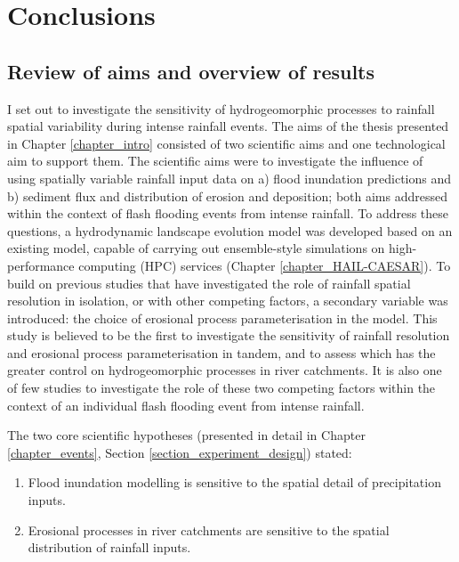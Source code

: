 \chapter{Conclusions}
\label{chapter_conclusion}

\section{Review of aims and overview of results}

I set out to investigate the sensitivity of hydrogeomorphic processes to rainfall spatial variability during intense rainfall events. The aims of the thesis presented in Chapter \ref{chapter_intro} consisted of two scientific aims and one technological aim to support them. The scientific aims were to investigate the influence of using spatially variable rainfall input data on a) flood inundation predictions and b) sediment flux and distribution of erosion and deposition; both aims addressed within the context of flash flooding events from intense rainfall. To address these questions, a hydrodynamic landscape evolution model was developed based on an existing model, capable of carrying out ensemble-style simulations on high-performance computing (HPC) services (Chapter \ref{chapter_HAIL-CAESAR}). To build on previous studies that have investigated the role of rainfall spatial resolution in isolation, or with other competing factors, a secondary variable was introduced: the choice of erosional process parameterisation in the model. This study is believed to be the first to investigate the sensitivity of rainfall resolution and erosional process parameterisation in tandem, and to assess which has the greater control on hydrogeomorphic processes in river catchments. It is also one of few studies to investigate the role of these two competing factors within the context of an individual flash flooding event from intense rainfall. 

The two core scientific hypotheses (presented in detail in Chapter \ref{chapter_events}, Section \ref{section_experiment_design}) stated:

\begin{enumerate}
\item Flood inundation modelling is sensitive to the spatial detail of precipitation inputs.
\item Erosional processes in river catchments are sensitive to the spatial distribution of rainfall inputs.
\end{enumerate}

